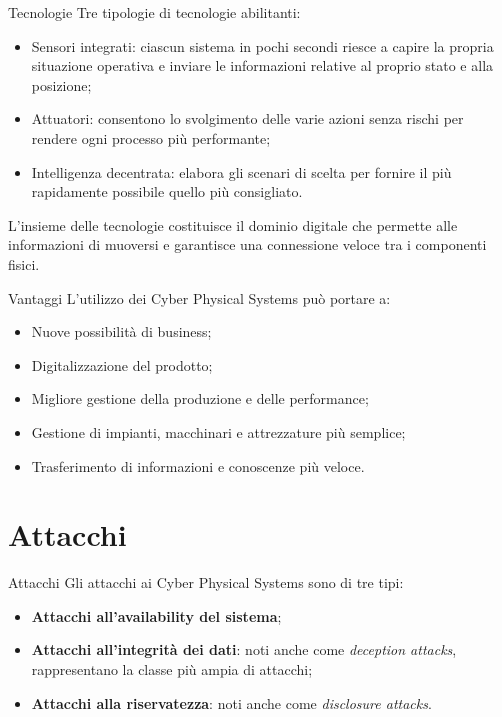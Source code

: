\documentclass{beamer}
\begin{document}
\begin{frame}{Tecnologie}
Tre tipologie di tecnologie abilitanti:
\begin{itemize}
    \item Sensori integrati: ciascun sistema in pochi secondi riesce a capire la propria situazione operativa e inviare le informazioni relative al proprio stato e alla posizione;
    \item Attuatori: consentono lo svolgimento delle varie azioni senza rischi per rendere ogni processo più performante;
    \item Intelligenza decentrata: elabora gli scenari di scelta per fornire il più rapidamente possibile quello più consigliato.
\end{itemize}

L'insieme delle tecnologie costituisce il dominio digitale che permette alle informazioni di muoversi e garantisce una connessione veloce tra i componenti fisici.

\end{frame}

\begin{frame}{Vantaggi}
L'utilizzo dei Cyber Physical Systems può portare a:
\begin{itemize}
    \item Nuove possibilità di business;
    \item Digitalizzazione del prodotto;
    \item Migliore gestione della produzione e delle performance;
    \item Gestione di impianti, macchinari e attrezzature più semplice;
    \item Trasferimento di informazioni e conoscenze più veloce.
\end{itemize}
    
\end{frame}

\section{Attacchi}

\begin{frame}{Attacchi}
Gli attacchi ai Cyber Physical Systems sono di tre tipi:
\begin{itemize}
    \item \textbf{Attacchi all'availability del sistema}; 
    \item \textbf{Attacchi all'integrità dei dati}: noti anche come \textit{deception attacks}, rappresentano la classe più ampia di attacchi;
    \item \textbf{Attacchi alla riservatezza}: noti anche come \textit{disclosure attacks}.
\end{itemize}
\end{frame}
\end{document}
